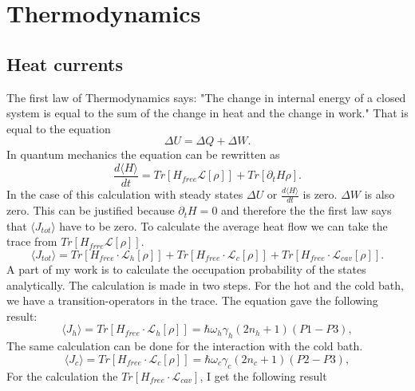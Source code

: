 \documentclass[12pt,a4paper]{article}
\begin{document}
\section{Thermodynamics}
\subsection{Heat currents}
The first law of Thermodynamics says: "The change in internal energy of a closed system is equal to the sum of the change in heat and the change in work."
That is  equal to the equation
\begin{equation}
\Delta U=\Delta Q+\Delta W.
\end{equation}
In quantum mechanics  the equation can be  rewritten as
\begin{equation}
\frac{d\langle H \rangle}{dt}=Tr[H_{free}\mathcal{L}[\rho]]+Tr[\partial_t H \rho]. \label{d}
\end{equation}
In the case of this calculation with steady states $\Delta U$ or $\frac{d\langle H \rangle}{dt}$ is zero. $\Delta W$ is also zero. This can be justified because $\partial_t H=0 $ and therefore the the first law says that $\langle J_{tot} \rangle$ have to be zero.
To calculate the average heat flow we can take the trace from $Tr[H_{frre}\mathcal{L}[\rho]]$. 
\begin{equation}
\langle J_{tot}\rangle=Tr[H_{free}\cdot \mathcal{L}_h[\rho]]+Tr[H_{free}\cdot \mathcal{L}_c[\rho]]+Tr[H_{free}\cdot \mathcal{L}_{cav}[\rho]].\label{13}
\end{equation}
A part of my work is to calculate the occupation probability of the states analytically. 
The calculation is made in two steps. For the hot and the cold bath, we have a transition-operators in the trace.
The equation gave the following result:
\begin{equation}
\langle J_h \rangle=Tr[H_{free}\cdot \mathcal{L}_h[\rho]]=\hbar \omega_h \gamma_h (2n_h+1) ( P1-P3) ,\label{a}
\end{equation}
The same calculation can be done for the interaction with the cold bath.
\begin{equation}
\langle J_c \rangle=Tr[H_{free}\cdot \mathcal{L}_c[\rho]]=\hbar \omega_c \gamma_c (2n_c+1) ( P2-P3) ,\label{b}
\end{equation}
For the calculation the $Tr[H_{free}\cdot \mathcal{L}_{cav}]$, I get the following result
\end{document}
